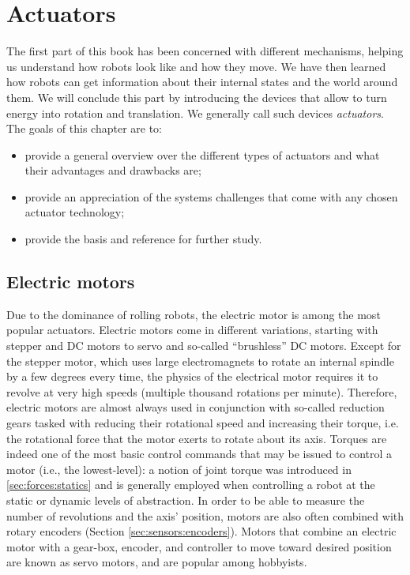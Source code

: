 \chapter{Actuators}

The first part of this book has been concerned with different mechanisms, helping us understand how robots look like and how they move. We have then learned how robots can get information about their internal states and the world around them. We will conclude this part by introducing the devices that allow to turn energy into rotation and translation. We generally call such devices \textsl{actuators}. The goals of this chapter are to:

\begin{itemize}
\item provide a general overview over the different types of actuators and what their advantages and drawbacks are;
\item provide an appreciation of the systems challenges that come with any chosen actuator technology;
\item provide the basis and reference for further study.
\end{itemize}

\section{Electric motors}

Due to the dominance of rolling robots, the electric motor \cite{hughes2019electric} is among the most popular actuators. Electric motors come in different variations, starting with stepper and DC motors to servo and so-called ``brushless'' DC motors. Except for the stepper motor, which uses large electromagnets to rotate an internal spindle by a few degrees every time, the physics of the electrical motor requires it to revolve at very high speeds (multiple thousand rotations per minute). Therefore, electric motors are almost always used in conjunction with so-called reduction gears tasked with reducing their rotational speed and increasing their torque, i.e. the rotational force that the motor exerts to rotate about its axis.
Torques are indeed one of the most basic control commands that may be issued to control a motor (i.e., the lowest-level): a notion of joint torque was introduced in \cref{sec:forces:statics} and is generally employed when controlling a robot at the static or dynamic levels of abstraction.
In order to be able to measure the number of revolutions and the axis' position, motors are also often combined with rotary encoders (Section \ref{sec:sensors:encoders}). Motors that combine an electric motor with a gear-box, encoder, and controller to move toward desired position are known as servo motors, and are popular among hobbyists.

